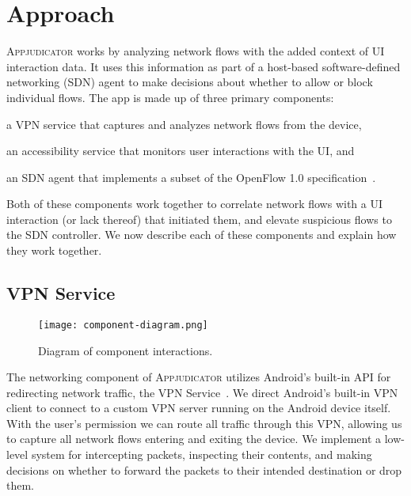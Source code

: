 \section{Approach}
\label{sec:approach}

\textsc{Appjudicator} works by analyzing network flows with the added context of
UI interaction data. It uses this information as part of a host-based
software-defined networking (SDN) agent to make decisions about whether to allow
or block individual flows. The app is made up of three primary components:
\begin{enumerate*}[label=(\arabic*)]
	\item a VPN service that captures and analyzes network flows from the
		device,
	\item an accessibility service that monitors user interactions with the
		UI, and
	\item an SDN agent that implements a subset of the OpenFlow 1.0
		specification~\cite{openflowspec}.
\end{enumerate*}
Both of these components work together to correlate network flows with a UI
interaction (or lack thereof) that initiated them, and elevate suspicious flows
to the SDN controller. We now describe each of these components and explain how
they work together.

\subsection{VPN Service}
\label{sec:approach-vpn-service}

\begin{wrapfigure}{r}{0.6\textwidth}
    \centering
    \texttt{[image: component-diagram.png]}
    \caption{Diagram of component interactions.}
    \label{fig:component-diagram}
\end{wrapfigure}

The networking component of \textsc{Appjudicator} utilizes Android's built-in
API for redirecting network traffic, the VPN
Service~\cite{googledevelopers2020vpn}. We direct Android's built-in
VPN client to connect to a custom VPN server running on the Android device
itself. With the user's permission we can route all traffic through this VPN,
allowing us to capture all network flows entering and exiting the device. We implement a
low-level system for intercepting packets, inspecting their contents, and making
decisions on whether to forward the packets to their intended destination or
drop them.

